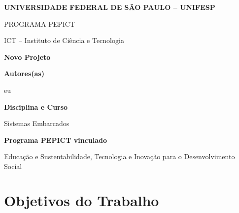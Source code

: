 \documentclass[12pt,a4paper]{article}
\begin{document}

\begin{center}

{\large \textbf{UNIVERSIDADE FEDERAL DE SÃO PAULO -- UNIFESP}}

\vspace{0.3cm}

{\normalsize PROGRAMA PEPICT}

\vspace{0.3cm}

{\normalsize ICT -- Instituto de Ciência e Tecnologia}

\vspace{1cm}

{\Large \textbf{Novo Projeto}}

\end{center}

\vspace{1cm}


\noindent
\textbf{Autores(as)}

eu

\vspace{0.7cm}


\noindent
\textbf{Disciplina e Curso}

Sistemas Embarcados

\vspace{0.7cm}


\noindent
\textbf{Programa PEPICT vinculado}

Educação e Sustentabilidade, Tecnologia e Inovação para o Desenvolvimento Social

\vspace{0.7cm}


\section*{Objetivos do Trabalho}
\end{document}
